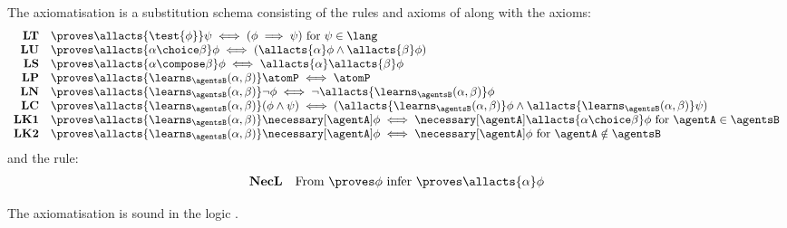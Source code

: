 \documentclass[twoside]{aiml14}
\begin{document}
  \begin{definition}\label{afl-k-axioms}
      The axiomatisation \axiomAflK{} is a substitution schema consisting of the
      rules and axioms of \axiomK{} along with the axioms:
      $$
      \begin{array}{rl}
          {\bf LT} & \proves \allacts{\test{\phi}} \psi \iff (\phi \implies \psi) \text{ for } \psi \in \lang\\
          {\bf LU} & \proves \allacts{\alpha \choice \beta} \phi \iff (\allacts{\alpha} \phi \land \allacts{\beta} \phi)\\
          {\bf LS} & \proves \allacts{\alpha \compose \beta} \phi \iff \allacts{\alpha} \allacts{\beta} \phi\\
          {\bf LP} & \proves \allacts{\learns_\agentsB (\alpha, \beta)} \atomP \iff \atomP\\
          {\bf LN} & \proves \allacts{\learns_\agentsB (\alpha, \beta)} \neg \phi \iff \neg \allacts{\learns_\agentsB (\alpha, \beta)} \phi\\
          {\bf LC} & \proves \allacts{\learns_\agentsB (\alpha, \beta)} (\phi \land \psi) \iff (\allacts{\learns_\agentsB (\alpha, \beta)} \phi \land \allacts{\learns_\agentsB (\alpha, \beta)} \psi)\\
          {\bf LK1} & \proves \allacts{\learns_\agentsB (\alpha, \beta)} \necessary[\agentA] \phi \iff \necessary[\agentA] \allacts{\alpha \choice \beta} \phi \text{ for } \agentA \in \agentsB\\
          {\bf LK2} & \proves \allacts{\learns_\agentsB (\alpha, \beta)} \necessary[\agentA] \phi \iff \necessary[\agentA] \phi \text{ for } \agentA \notin \agentsB
      \end{array}
      $$
      and the rule:
      $$
      \begin{array}{rl}
          {\bf NecL} & \text{From $\proves \phi$ infer $\proves \allacts{\alpha} \phi$}
      \end{array}
      $$
  \end{definition}

  \begin{proposition}\label{afl-k-axioms-soundness}
      The axiomatisation \axiomAflK{} is sound in the logic \logicAmlK{}.
  \end{proposition}
\end{document}
